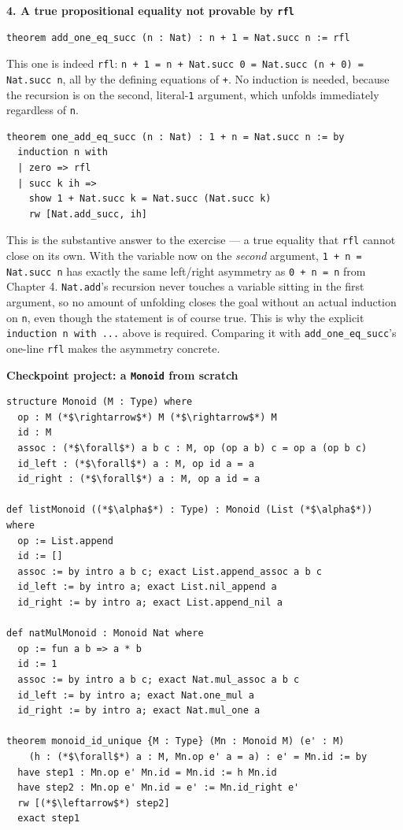 \textbf{4. A true propositional equality not provable by \texttt{rfl}}

\begin{lstlisting}
theorem add_one_eq_succ (n : Nat) : n + 1 = Nat.succ n := rfl
\end{lstlisting}

This one is indeed \texttt{rfl}: \texttt{n + 1 = n + Nat.succ 0 = Nat.succ (n + 0) = Nat.succ n}, all by the defining equations of \texttt{+}. No induction is needed, because the recursion is on the second, literal-\texttt{1} argument, which unfolds immediately regardless of \texttt{n}.

\begin{lstlisting}
theorem one_add_eq_succ (n : Nat) : 1 + n = Nat.succ n := by
  induction n with
  | zero => rfl
  | succ k ih =>
    show 1 + Nat.succ k = Nat.succ (Nat.succ k)
    rw [Nat.add_succ, ih]
\end{lstlisting}

This is the substantive answer to the exercise --- a true equality that \texttt{rfl} cannot close on its own. With the variable now on the \emph{second} argument, \texttt{1 + n = Nat.succ n} has exactly the same left/right asymmetry as \texttt{0 + n = n} from Chapter 4. \texttt{Nat.add}'s recursion never touches a variable sitting in the first argument, so no amount of unfolding closes the goal without an actual induction on \texttt{n}, even though the statement is of course true. This is why the explicit \texttt{induction n with ...} above is required. Comparing it with \texttt{add\_\allowbreak{}one\_\allowbreak{}eq\_\allowbreak{}succ}'s one-line \texttt{rfl} makes the asymmetry concrete.

\textbf{Checkpoint project: a \texttt{Monoid} from scratch}

\begin{lstlisting}
structure Monoid (M : Type) where
  op : M (*$\rightarrow$*) M (*$\rightarrow$*) M
  id : M
  assoc : (*$\forall$*) a b c : M, op (op a b) c = op a (op b c)
  id_left : (*$\forall$*) a : M, op id a = a
  id_right : (*$\forall$*) a : M, op a id = a

def listMonoid ((*$\alpha$*) : Type) : Monoid (List (*$\alpha$*)) where
  op := List.append
  id := []
  assoc := by intro a b c; exact List.append_assoc a b c
  id_left := by intro a; exact List.nil_append a
  id_right := by intro a; exact List.append_nil a

def natMulMonoid : Monoid Nat where
  op := fun a b => a * b
  id := 1
  assoc := by intro a b c; exact Nat.mul_assoc a b c
  id_left := by intro a; exact Nat.one_mul a
  id_right := by intro a; exact Nat.mul_one a

theorem monoid_id_unique {M : Type} (Mn : Monoid M) (e' : M)
    (h : (*$\forall$*) a : M, Mn.op e' a = a) : e' = Mn.id := by
  have step1 : Mn.op e' Mn.id = Mn.id := h Mn.id
  have step2 : Mn.op e' Mn.id = e' := Mn.id_right e'
  rw [(*$\leftarrow$*) step2]
  exact step1
\end{lstlisting}

